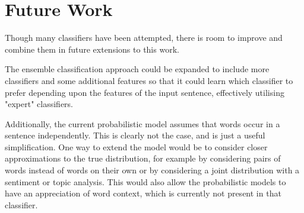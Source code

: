 \section{Future Work}
\label{sec:future_work}
Though many classifiers have been attempted, there is room to improve and combine them in future extensions to this work.

The ensemble classification approach could be expanded to include more classifiers and some additional
features so that it could learn which classifier to prefer depending
upon the features of the input sentence, effectively utilising "expert" classifiers.

Additionally, the current probabilistic model assumes that words
occur in a sentence independently. This is clearly not the case, and is just a useful simplification.
One way to extend the model would be to consider closer approximations to the
true distribution, for example by considering pairs of words instead of words on
their own or by considering a joint distribution with a sentiment or topic
analysis. This would also allow the probabilistic models to have an appreciation of word context, which is currently not present in that classifier.
